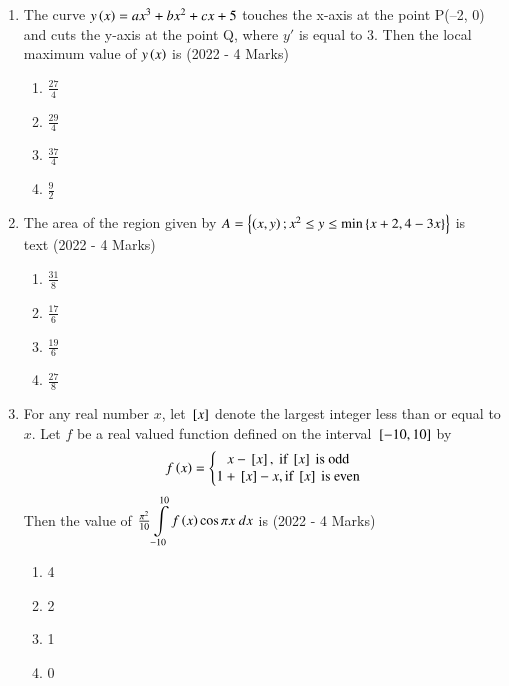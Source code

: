 \documentclass[journal]{IEEEtran}
\begin{document}
\begin{enumerate}
{        }
 	\item{
			The curve $y\left(x\right) = ax^3 + bx^2 + cx + 5$ touches the x-axis at the point P(–2, 0) and cuts the y-axis at the point Q, where $y'$ is equal to 3. Then the local maximum value of $y\left(x\right)$ is
			\text{ }
			\hfill
			{(2022 - 4 Marks)}
			
			\begin{multicols}{4}
				\begin{enumerate}
					\item $\frac{27}{4}$
					\item $\frac{29}{4}$
					\item $\frac{37}{4}$
					\item $\frac{9}{2}$
				\end{enumerate}
			\end{multicols}
			
		}
 	\item{
			The area of the region given by $A=\left\{\left(x,y\right);x^2\leq y \leq \text{min}\left\{x+2, 4-3x\right\}\right\}$ is \\text{ } \hfill
			{(2022 - 4 Marks)}
			
			\begin{multicols}{2}
				\begin{enumerate}
					\item $\frac{31}{8}$
					\item $\frac{17}{6}$
					\item $\frac{19}{6}$
					\item $\frac{27}{8}$
				\end{enumerate}
			\end{multicols}
			
		}
    \item{
            For any real number $x$, let ${}\left[x\right]$ denote the largest integer less than or equal to $x$. Let $f$ be a real valued function defined on the interval ${}\left[-10, 10\right]$ by $$ f\left(x\right)=\left\{\begin{matrix}x-{}\left[x\right], \text{ if } {}\left[x\right] \text{ is odd} \\1+{}\left[x\right]-x, \text{if }{}\left[x\right]\text{ is even}\end{matrix}\right.$$ Then the value of $\frac{\pi^2}{10}\displaystyle\int\limits_{-10}^{10}f\left(x\right)\cos\pi x\ dx$ is
             \text{ }
             \hfill
                {(2022 - 4 Marks)}
            \begin{multicols}{4}
                \begin{enumerate}
                	\item 4
                    \item 2
                    \item 1
                    \item 0
                \end{enumerate}
            \end{multicols}

}
\end{enumerate}
\end{document}
